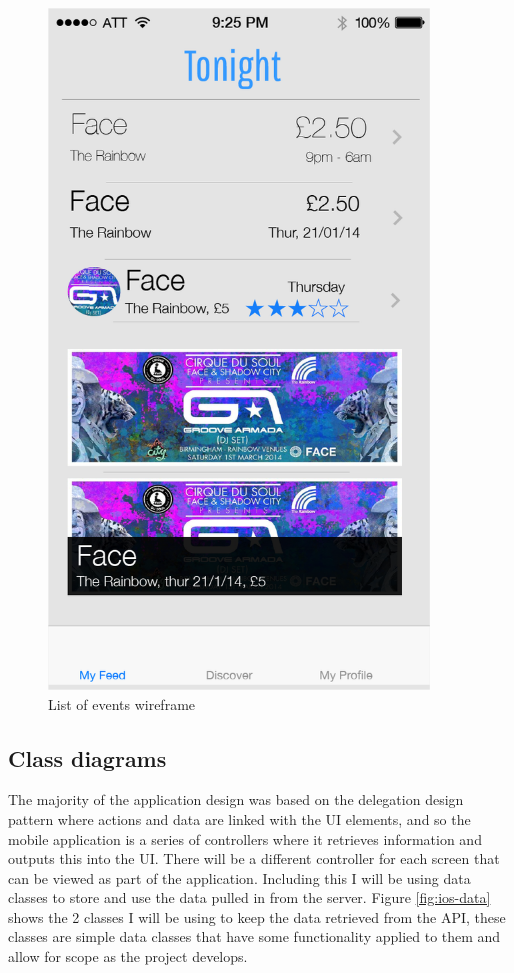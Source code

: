 \begin{figure}[H]
\begin{minipage}{.5\linewidth}
					\includegraphics[width=0.9\textwidth]{Images/multi-events}
					\caption{List of events wireframe}
					\label{fig:multi-events}
				\end{minipage}
				\label{fig:wireframes}
			\end{figure}

		\subsection{Class diagrams}
			The majority of the application design was based on the delegation design pattern where actions and data are linked with the UI elements, and so the mobile application is a series of controllers where it retrieves information and outputs this into the UI. There will be a different controller for each screen that can be viewed as part of the application. Including this I will be using data classes to store and use the data pulled in from the server. Figure \ref{fig:ios-data} shows the 2 classes I will be using to keep the data retrieved from the API, these classes are simple data classes that have some functionality applied to them and allow for scope as the project develops. 

